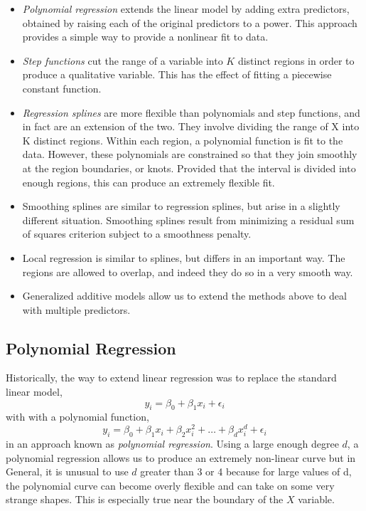 \documentclass{article}
\numberwithin{equation}{section}
\begin{document}
\begin{enumerate}
\begin{itemize}
    \item \textit{Polynomial regression} extends the linear model by adding extra predictors, obtained by raising each of the original predictors to a power. This approach provides a simple way to provide a nonlinear fit to data.
    \item \textit{Step functions} cut the range of a variable into $K$ distinct regions in order to produce a qualitative variable. This has the effect of fitting a piecewise constant function.
    \item \textit{Regression splines} are more flexible than polynomials and step functions, and in fact are an extension of the two. They involve dividing the range of X into K distinct regions. Within each region, a polynomial function is fit to the data. However, these polynomials are constrained so that they join smoothly at the region boundaries, or knots. Provided that the interval is divided into enough regions, this can produce an extremely flexible fit.
    \item Smoothing splines are similar to regression splines, but arise in a slightly different situation. Smoothing splines result from minimizing a residual sum of squares criterion subject to a smoothness penalty.
    \item Local regression is similar to splines, but differs in an important way. The regions are allowed to overlap, and indeed they do so in a very smooth way.
    \item Generalized additive models allow us to extend the methods above to deal with multiple predictors.
\end{itemize}
\subsection{Polynomial Regression}
Historically, the way to extend linear regression was to replace the standard linear model,
\[
    y_i = \beta_0 + \beta_1 x_i + \epsilon_i
\]
with with a polynomial function,
\begin{equation}
    y_i = \beta_0 + \beta_1 x_i + \beta_2 x_i^2 + \dots + \beta_d x_i^d + \epsilon_i
\end{equation}
in an approach known as \textit{polynomial regression}. Using a large enough degree $d$, a polynomial regression allows us to produce an extremely non-linear curve but in General, it is unusual
to use $d$ greater than 3 or 4 because for large values of d, the polynomial curve can become overly flexible and can take on some very strange shapes. This is especially true near the boundary of the $X$ variable.


\end{enumerate}
\end{document}
